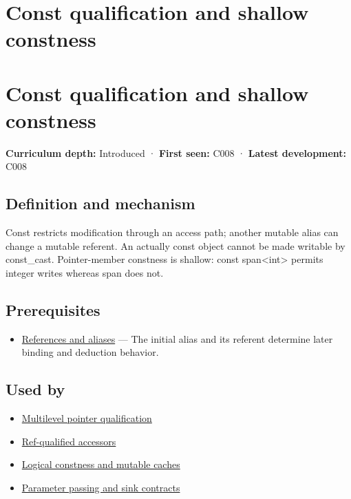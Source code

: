 \hypertarget{appendix-c25d60fed375}{}
\section*{Const qualification and shallow constness}
\section{Const qualification and shallow constness}\label{const-qualification-and-shallow-constness}

\textbf{Curriculum depth:} Introduced · \textbf{First seen:} C008 · \textbf{Latest development:} C008

\subsection{Definition and mechanism}\label{definition-and-mechanism}

Const restricts modification through an access path; another mutable alias can change a mutable referent. An actually const object cannot be made writable by const\_cast. Pointer-member constness is shallow: const span\textless int\textgreater{} permits integer writes whereas span does not.

\subsection{Prerequisites}\label{prerequisites}

\begin{itemize}
\tightlist
\item
  \hyperref[appendix-d6d562ca9fbb]{References and aliases} --- The initial alias and its referent determine later binding and deduction behavior.
\end{itemize}

\subsection{Used by}\label{used-by}

\begin{itemize}
\tightlist
\item
  \hyperref[appendix-5e1a7561cd98]{Multilevel pointer qualification}
\item
  \hyperref[appendix-d42039b1d6f7]{Ref-qualified accessors}
\item
  \hyperref[appendix-f5593256bcaf]{Logical constness and mutable caches}
\item
  \hyperref[appendix-d5908f75721f]{Parameter passing and sink contracts}
\end{itemize}

